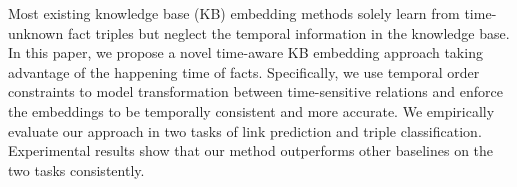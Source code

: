 Most existing knowledge base (KB) embedding methods solely learn from time-unknown fact triples but neglect the temporal information in the knowledge base. In this paper, we propose a novel time-aware KB embedding approach taking advantage of the happening time of facts. Specifically, we use temporal order constraints to model transformation between time-sensitive relations and enforce the embeddings to be temporally consistent and more accurate. We empirically evaluate our approach in two tasks of link prediction and triple classification. Experimental results show that our method outperforms other baselines on the two tasks consistently.
